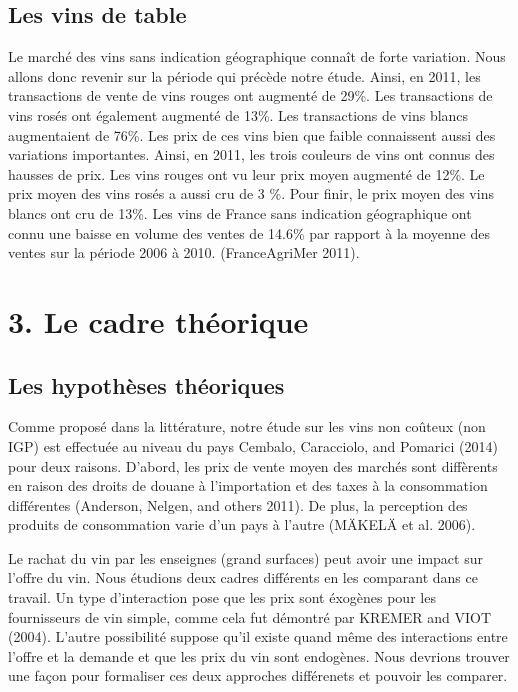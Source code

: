 \documentclass[11pt,]{article}
\begin{document}
\hypertarget{les-vins-de-table}{%
\subsection{Les vins de table}\label{les-vins-de-table}}

Le marché des vins sans indication géographique connaît de forte
variation. Nous allons donc revenir sur la période qui précède notre
étude. Ainsi, en 2011, les transactions de vente de vins rouges ont
augmenté de 29\%. Les transactions de vins rosés ont également augmenté
de 13\%. Les transactions de vins blancs augmentaient de 76\%. Les prix
de ces vins bien que faible connaissent aussi des variations
importantes. Ainsi, en 2011, les trois couleurs de vins ont connus des
hausses de prix. Les vins rouges ont vu leur prix moyen augmenté de
12\%. Le prix moyen des vins rosés a aussi cru de 3 \%. Pour finir, le
prix moyen des vins blancs ont cru de 13\%. Les vins de France sans
indication géographique ont connu une baisse en volume des ventes de
14.6\% par rapport à la moyenne des ventes sur la période 2006 à 2010.
(FranceAgriMer 2011).

\hypertarget{le-cadre-theorique}{%
\section{3. Le cadre théorique}\label{le-cadre-theorique}}

\hypertarget{les-hypotheses-theoriques}{%
\subsection{Les hypothèses théoriques}\label{les-hypotheses-theoriques}}

Comme proposé dans la littérature, notre étude sur les vins non coûteux
(non IGP) est effectuée au niveau du pays Cembalo, Caracciolo, and
Pomarici (2014) pour deux raisons. D'abord, les prix de vente moyen des
marchés sont diffèrents en raison des droits de douane à l'importation
et des taxes à la consommation différentes (Anderson, Nelgen, and others
2011). De plus, la perception des produits de consommation varie d'un
pays à l'autre (MÄKELÄ et al. 2006).

Le rachat du vin par les enseignes (grand surfaces) peut avoir une
impact sur l'offre du vin. Nous étudions deux cadres différents en les
comparant dans ce travail. Un type d'interaction pose que les prix sont
éxogènes pour les fournisseurs de vin simple, comme cela fut démontré
par KREMER and VIOT (2004). L'autre possibilité suppose qu'il existe
quand même des interactions entre l'offre et la demande et que les prix
du vin sont endogènes. Nous devrions trouver une façon pour formaliser
ces deux approches différenets et pouvoir les comparer.
\end{document}
